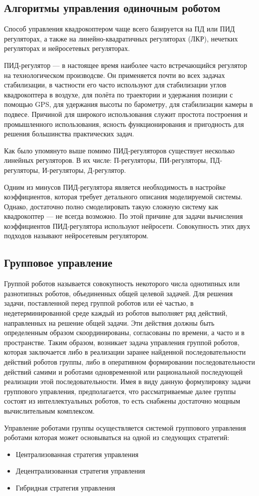 \documentclass[a4paper, 14pt]{extarticle}
\begin{document}
\subsection{Алгоритмы управления одиночным роботом}
Способ управления квадрокоптером чаще всего базируется на ПД или ПИД регуляторах, а также на линейно-квадратичных
регуляторах (ЛКР), нечетких регуляторах и нейросетевых регуляторах.
\par
ПИД-регулятор — в настоящее время наиболее часто встречающийся регулятор на технологическом производсве. Он применяется почти во всех задачах стабилизации, в частности его часто используют для стабилизации углов квадрокоптера в воздухе, для полёта по траектории и удержания позиции с помощью GPS, для удержания высоты по барометру, для стабилизации камеры в подвесе. Причиной для широкого использования служит простота построения и промышленного использования, ясность функционирования и пригодность для решения большинства практических задач.
\par
Как было упомянуто выше помимо ПИД-регуляторов существует несколько линейных регуляторов. В их числе: П-регуляторы, ПИ-регуляторы, ПД-регуляторы, И-регуляторы, Д-регулятор.
\par
Одним из минусов ПИД-регулятора является необходимость в настройке коэффициентов, которая требует  детального описания моделируемой системы. Однако, достаточно полно смоделировать такую сложную систему как квадрокоптер — не всегда возможно. По этой причине для задачи вычисления коэффициентов ПИД-регулятора используют нейросети. Совокупность этих двух подходов называют нейросетевым регулятором. \par
\subsection{Групповое управление}
Группой роботов называется совокупность
некоторого числа однотипных или разнотипных роботов, объединенных
общей целевой задачей. Для решения задачи, поставленной перед группой роботов или еѐ
частью, в недетерминированной среде каждый из роботов выполняет ряд
действий, направленных на решение общей задачи. Эти действия 
должны быть определенным образом скоординированы, согласованы по
времени, а часто и в пространстве. Таким образом, возникает задача
управления группой роботов, которая заключается либо в реализации
заранее найденной последовательности действий роботов группы, либо в
оперативном
формировании
последовательности
действий
самими
и
роботами
одновременной
или
рациональной
последующей
реализации этой последовательности. Имея в виду данную формулировку задачи группового управления,
предполагается,
что
рассматриваемые
далее
группы
состоят
из интеллектуальных роботов, то есть снабжены достаточно мощным вычислительным комплексом.
\par
Управление роботами группы осуществляется системой группового
управления роботами которая может основываться на одной из следующих стратегий:
\begin{itemize}
	\item Централизованная стратегия управления
	\item Децентрализованная стратегия управления
	\item Гибридная стратегия управления
\end{itemize}
\end{document}
